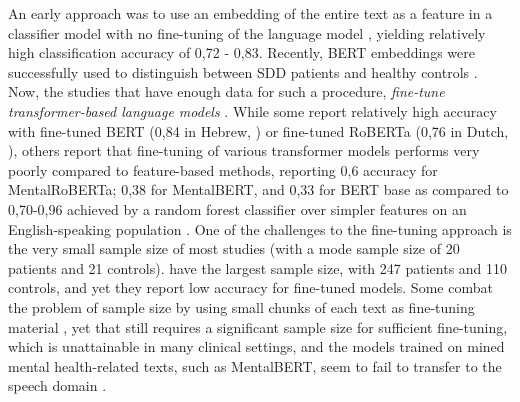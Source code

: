 An early approach was to use an embedding of the entire text as a feature in a classifier model with no fine-tuning of the language model \citep{elvevaag2010automated, rosenstein2015language}, yielding relatively high classification accuracy of 0,72 - 0,83. Recently, BERT embeddings were successfully used to distinguish between SDD patients and healthy controls \citep{srivastava2022p473}. Now, the studies that have enough data for such a procedure, \textit{fine-tune transformer-based language models} \citep{wouts2021belabbert, aich2022towards, shriki2022masking}. While some report relatively high accuracy with fine-tuned BERT (0,84 in Hebrew, \cite{shriki2022masking}) or fine-tuned RoBERTa (0,76 in Dutch, \cite{wouts2021belabbert}), others report that fine-tuning of various transformer models performs very poorly compared to feature-based methods, reporting 0,6 accuracy for MentalRoBERTa; 0,38 for MentalBERT, and 0,33 for BERT base as compared to 0,70-0,96 achieved by a random forest classifier over simpler features on an English-speaking population \citep{aich2022towards}. One of the challenges to the fine-tuning approach is the very small sample size of most studies (with a mode sample size of 20 patients and 21 controls). \citet{aich2022towards} have the largest sample size, with 247 patients and 110 controls, and yet they report low accuracy for fine-tuned models. Some combat the problem of sample size by using small chunks of each text as fine-tuning material \citep{wouts2021belabbert}, yet that still requires a significant sample size for sufficient fine-tuning, which is unattainable in many clinical settings, and the models trained on mined mental health-related texts, such as MentalBERT, seem to fail to transfer to the speech domain \citep{aich2022towards}.

